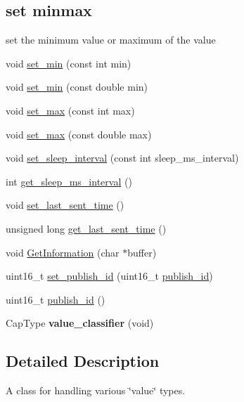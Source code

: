 \subsection*{set minmax}
\label{_amgrpeb6adde6c3d1342f9f7e836458261376}%
set the minimum value or maximum of the value \begin{DoxyCompactItemize}
\item 
void \hyperlink{classCapitalValue_a03a3a61ac89ca22217d70f9e994ba626}{set\-\_\-min} (const int min)
\item 
void \hyperlink{classCapitalValue_aefa6475018a28c0da762fd7745a41889}{set\-\_\-min} (const double min)
\item 
void \hyperlink{classCapitalValue_ac705c35ce64975954797c656035cccf7}{set\-\_\-max} (const int max)
\item 
void \hyperlink{classCapitalValue_ac988143df3a5cbfb5be4d22a1df98a40}{set\-\_\-max} (const double max)
\item 
void \hyperlink{classCapitalValue_a0fd08d86c80f5ba6cab75bc70d1b414d}{set\-\_\-sleep\-\_\-interval} (const int sleep\-\_\-ms\-\_\-interval)
\item 
int \hyperlink{classCapitalValue_a1353a4416373057d6fcdd5eb62743b21}{get\-\_\-sleep\-\_\-ms\-\_\-interval} ()
\item 
void \hyperlink{classCapitalValue_abca018e41ea2675b8b58373e42d7929d}{set\-\_\-last\-\_\-sent\-\_\-time} ()
\item 
unsigned long \hyperlink{classCapitalValue_a2b9cefc45d6d2b2703a547687243011a}{get\-\_\-last\-\_\-sent\-\_\-time} ()
\item 
void \hyperlink{classCapitalValue_a365ec2c0a0b26a0eae6d1000381b4490}{Get\-Information} (char $\ast$buffer)
\item 
uint16\-\_\-t \hyperlink{classCapitalValue_a19de091c0feed8acc0643c5a67b64aa4}{set\-\_\-publish\-\_\-id} (uint16\-\_\-t \hyperlink{classCapitalValue_a4b9611c162c3ec521e6e23946b7b9a92}{publish\-\_\-id})
\item 
uint16\-\_\-t \hyperlink{classCapitalValue_a4b9611c162c3ec521e6e23946b7b9a92}{publish\-\_\-id} ()
\item 
\hypertarget{classCapitalValue_a8c0c9af4bb111c7731d582e3974647db}{Cap\-Type {\bfseries value\-\_\-classifier} (void)}\label{classCapitalValue_a8c0c9af4bb111c7731d582e3974647db}

\end{DoxyCompactItemize}


\subsection{Detailed Description}
A class for handling various \char`\"{}value\char`\"{} types. 

